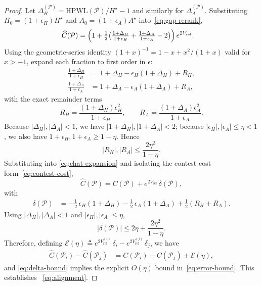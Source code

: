 \documentclass[nolineno]{ieeeaccess}
\begin{document}
\begin{proof}
Let $\Delta_H^{(\mathcal{P})} = \text{HPWL}(\mathcal{P})/H^{\star} - 1$
and similarly for $\Delta_A^{(\mathcal{P})}$. Substituting
$H_0 = (1+\epsilon_H)H^{\star}$ and $A_0 = (1+\epsilon_A)A^{\star}$
into~\eqref{eq:gap-rerank},
\begin{align}
\widehat{C}(\mathcal{P}) &= \Bigl(
   1 + \tfrac{1}{2}\bigl(\tfrac{1+\Delta_H}{1+\epsilon_H} +
                         \tfrac{1+\Delta_A}{1+\epsilon_A} - 2\bigr)
   \Bigr)\,e^{2V_{\text{rel}}}.
\label{eq:chat-expansion}
\end{align}
Using the geometric-series identity $(1+x)^{-1} = 1 - x + x^2/(1+x)$
valid for $x > -1$, expand each fraction to first order in $\epsilon$:
\begin{align}
\tfrac{1+\Delta_H}{1+\epsilon_H} &= 1 + \Delta_H - \epsilon_H(1+\Delta_H) + R_H,\\
\tfrac{1+\Delta_A}{1+\epsilon_A} &= 1 + \Delta_A - \epsilon_A(1+\Delta_A) + R_A,
\label{eq:expansion}
\end{align}
with the exact remainder terms
\begin{equation}
R_H = \frac{(1+\Delta_H)\epsilon_H^2}{1+\epsilon_H},\qquad
R_A = \frac{(1+\Delta_A)\epsilon_A^2}{1+\epsilon_A}.
\label{eq:remainder}
\end{equation}
Because $|\Delta_H|,|\Delta_A|<1$, we have $|1+\Delta_H|,|1+\Delta_A|<2$;
because $|\epsilon_H|,|\epsilon_A|\le \eta<1$, we also have
$1+\epsilon_H,1+\epsilon_A \ge 1-\eta$. Hence
\begin{equation}
|R_H|, |R_A| \le \frac{2\eta^2}{1-\eta}.
\label{eq:remainder-bound}
\end{equation}
Substituting into
\eqref{eq:chat-expansion} and isolating the contest-cost
form~\eqref{eq:contest-cost},
\begin{equation}
\widehat{C}(\mathcal{P}) = C(\mathcal{P}) + e^{2V_{\text{rel}}}\,\delta(\mathcal{P}),
\label{eq:residual}
\end{equation}
with
\begin{align*}
\delta(\mathcal{P}) &=
 -\tfrac{1}{2}\,\epsilon_H(1+\Delta_H)
 -\tfrac{1}{2}\,\epsilon_A(1+\Delta_A) + \tfrac{1}{2}(R_H + R_A).
\end{align*}
Using $|\Delta_H|, |\Delta_A| < 1$ and
$|\epsilon_H|, |\epsilon_A| \le \eta$,
\begin{equation}
|\delta(\mathcal{P})| \le
 2\eta + \frac{2\eta^2}{1-\eta}.
\label{eq:delta-bound}
\end{equation}
Therefore, defining $\mathcal{E}(\eta) \triangleq
e^{2V_{\text{rel}}^{(i)}}\,\delta_i - e^{2V_{\text{rel}}^{(j)}}\,\delta_j$, we have
\begin{align}
\widehat{C}(\mathcal{P}_i) - \widehat{C}(\mathcal{P}_j)
&= C(\mathcal{P}_i) - C(\mathcal{P}_j) + \mathcal{E}(\eta),
\end{align}
and \eqref{eq:delta-bound} implies the explicit
$O(\eta)$ bound in~\eqref{eq:error-bound}. This establishes
~\eqref{eq:alignment}.
\end{proof}
\end{document}
